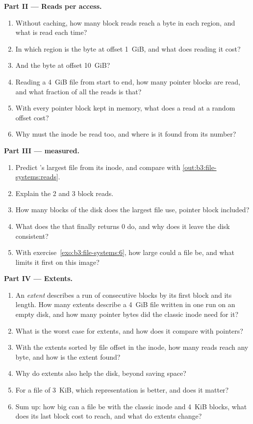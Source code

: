 \begin{problem}
\medskip\noindent\textbf{Part II --- Reads per access.}
\begin{enumerate}[resume]
\item Without caching, how many block reads reach a byte in each region, and what is read each time?
\item In which region is the byte at offset 1~GiB, and what does reading it cost?
\item And the byte at offset 10~GiB?
\item Reading a 4~GiB file from start to end, how many pointer blocks are read, and what fraction of all the reads is that?
\item With every pointer block kept in memory, what does a read at a random offset cost?
\item Why must the inode be read too, and where is it found from its number?
\end{enumerate}

\medskip\noindent\textbf{Part III ---  measured.}
\begin{enumerate}[resume]
\item Predict 's largest file from its inode, and compare with \cref{out:b3:file-systems:reads}.
\item Explain the 2 and 3 block reads.
\item How many blocks of the disk does the largest file use, pointer block included?
\item What does the  that finally returns 0 do, and why does it leave the disk consistent?
\item With exercise~\ref{exo:b3:file-systems:6}, how large could a file be, and what limits it first on this image?
\end{enumerate}

\medskip\noindent\textbf{Part IV --- Extents.}
\begin{enumerate}[resume]
\item An \emph{extent} describes a run of consecutive blocks by its first block and its length. How many extents describe a 4~GiB file written in one run on an empty disk, and how many pointer bytes did the classic inode need for it?
\item What is the worst case for extents, and how does it compare with pointers?
\item With the extents sorted by file offset in the inode, how many reads reach any byte, and how is the extent found?
\item Why do extents also help the disk, beyond saving space?
\item For a file of 3~KiB, which representation is better, and does it matter?
\item Sum up: how big can a file be with the classic inode and 4~KiB blocks, what does its last block cost to reach, and what do extents change?
\end{enumerate}
\end{problem}
